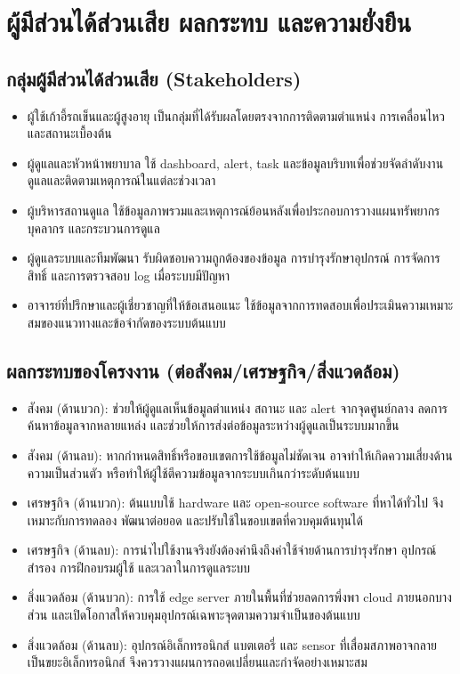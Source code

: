 \section{ผู้มีส่วนได้ส่วนเสีย ผลกระทบ และความยั่งยืน}

\subsection*{กลุ่มผู้มีส่วนได้ส่วนเสีย (Stakeholders)}
\begin{itemize}
    \item ผู้ใช้เก้าอี้รถเข็นและผู้สูงอายุ เป็นกลุ่มที่ได้รับผลโดยตรงจากการติดตามตำแหน่ง การเคลื่อนไหว และสถานะเบื้องต้น 
    \item ผู้ดูแลและหัวหน้าพยาบาล ใช้ dashboard, alert, task และข้อมูลบริบทเพื่อช่วยจัดลำดับงานดูแลและติดตามเหตุการณ์ในแต่ละช่วงเวลา 
    \item ผู้บริหารสถานดูแล ใช้ข้อมูลภาพรวมและเหตุการณ์ย้อนหลังเพื่อประกอบการวางแผนทรัพยากร บุคลากร และกระบวนการดูแล 
    \item ผู้ดูแลระบบและทีมพัฒนา รับผิดชอบความถูกต้องของข้อมูล การบำรุงรักษาอุปกรณ์ การจัดการสิทธิ์ และการตรวจสอบ log เมื่อระบบมีปัญหา 
    \item อาจารย์ที่ปรึกษาและผู้เชี่ยวชาญที่ให้ข้อเสนอแนะ ใช้ข้อมูลจากการทดสอบเพื่อประเมินความเหมาะสมของแนวทางและข้อจำกัดของระบบต้นแบบ 
\end{itemize}

\subsection*{ผลกระทบของโครงงาน (ต่อสังคม/เศรษฐกิจ/สิ่งแวดล้อม)}
\begin{itemize}
    \item สังคม (ด้านบวก): ช่วยให้ผู้ดูแลเห็นข้อมูลตำแหน่ง สถานะ และ alert จากจุดศูนย์กลาง ลดการค้นหาข้อมูลจากหลายแหล่ง และช่วยให้การส่งต่อข้อมูลระหว่างผู้ดูแลเป็นระบบมากขึ้น 
    \item สังคม (ด้านลบ): หากกำหนดสิทธิ์หรือขอบเขตการใช้ข้อมูลไม่ชัดเจน อาจทำให้เกิดความเสี่ยงด้านความเป็นส่วนตัว หรือทำให้ผู้ใช้ตีความข้อมูลจากระบบเกินกว่าระดับต้นแบบ 
    \item เศรษฐกิจ (ด้านบวก): ต้นแบบใช้ hardware และ open-source software ที่หาได้ทั่วไป จึงเหมาะกับการทดลอง พัฒนาต่อยอด และปรับใช้ในขอบเขตที่ควบคุมต้นทุนได้ 
    \item เศรษฐกิจ (ด้านลบ): การนำไปใช้งานจริงยังต้องคำนึงถึงค่าใช้จ่ายด้านการบำรุงรักษา อุปกรณ์สำรอง การฝึกอบรมผู้ใช้ และเวลาในการดูแลระบบ 
    \item สิ่งแวดล้อม (ด้านบวก): การใช้ edge server ภายในพื้นที่ช่วยลดการพึ่งพา cloud ภายนอกบางส่วน และเปิดโอกาสให้ควบคุมอุปกรณ์เฉพาะจุดตามความจำเป็นของต้นแบบ 
    \item สิ่งแวดล้อม (ด้านลบ): อุปกรณ์อิเล็กทรอนิกส์ แบตเตอรี่ และ sensor ที่เสื่อมสภาพอาจกลายเป็นขยะอิเล็กทรอนิกส์ จึงควรวางแผนการถอดเปลี่ยนและกำจัดอย่างเหมาะสม 
\end{itemize}

